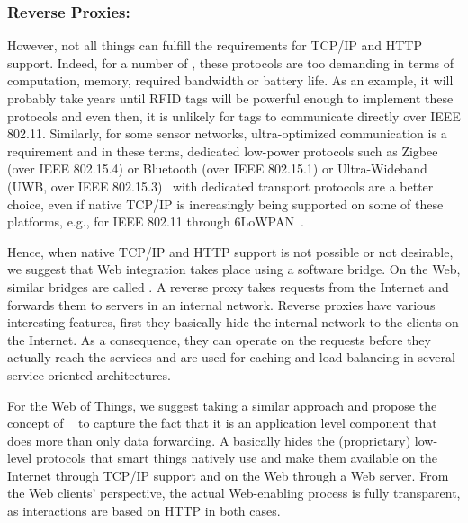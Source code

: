 \subsubsection{Reverse Proxies: \sgs{}}\label{smartGateways}
However, not all things can fulfill the requirements for TCP/IP and HTTP support. Indeed, for a number of \sts{}, these protocols are too demanding in terms of computation, memory, required bandwidth or battery life. As an example, it will probably take years until RFID tags will be powerful enough to implement these protocols and even then, it is unlikely for tags to communicate directly over IEEE 802.11. Similarly, for some sensor networks, ultra-optimized communication is a requirement and in these terms, dedicated low-power protocols such as Zigbee (over IEEE 802.15.4) or Bluetooth (over IEEE 802.15.1) or Ultra-Wideband
(UWB, over IEEE 802.15.3)~\cite{Lee2007} with dedicated transport protocols are a better choice, even if native TCP/IP is increasingly being supported on some of these platforms, e.g., for IEEE 802.11 through 6LoWPAN~\cite{Hui2008}.

Hence, when native TCP/IP and HTTP support is not possible or not desirable, we suggest that Web integration takes place using a software bridge. On the Web, similar bridges are called . A reverse proxy takes requests from the Internet and forwards them to servers in an internal network. Reverse proxies have various interesting features, first they basically hide the internal network to the clients on the Internet. As a consequence, they can operate on the requests before they actually reach the services and are used for caching and load-balancing in several service oriented architectures.

For the Web of Things, we suggest taking a similar approach and propose the concept of \newterm{\sgs{}}~\cite{Trifa2009,Guinard2009,Guinard2010-WoT,Guinard2010-Search} to capture the fact that it is an application level component that does more than only data forwarding. A \st{} basically hides the (proprietary) low-level protocols that smart things natively use and make them available on the Internet through TCP/IP support and on the Web through a Web server. From the Web clients' perspective, the actual Web-enabling process is fully transparent, as interactions are based on HTTP in both cases.


